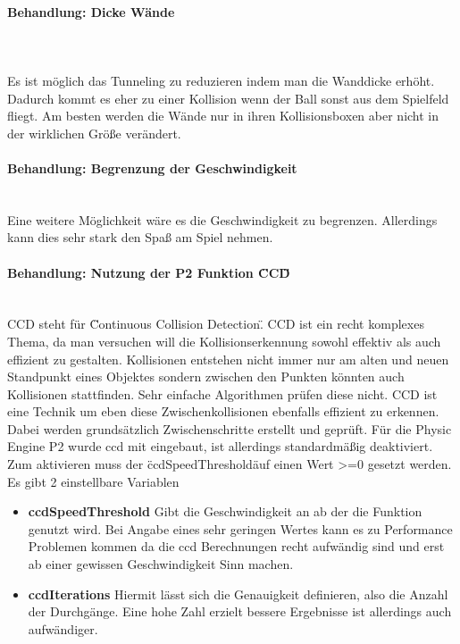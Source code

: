 \paragraph{Behandlung: Dicke Wände}\\
\mbox{}\\
Es ist möglich das Tunneling zu reduzieren indem man die Wanddicke erhöht. Dadurch kommt es eher zu einer Kollision wenn der Ball sonst aus dem Spielfeld fliegt.
\newline
Am besten werden die Wände nur in ihren Kollisionsboxen aber nicht in der wirklichen Größe verändert.
\paragraph{Behandlung: Begrenzung der Geschwindigkeit}
\mbox{}\\
Eine weitere Möglichkeit wäre es die Geschwindigkeit zu begrenzen. Allerdings kann dies sehr stark den Spaß am Spiel nehmen.
\paragraph{Behandlung: Nutzung der P2 Funktion \"CCD\" }
\mbox{}\\
CCD steht für \"Continuous Collision Detection\". 
\newline
CCD ist ein recht komplexes Thema, da man versuchen will die Kollisionserkennung sowohl effektiv als auch effizient zu gestalten.
\newline
Kollisionen entstehen nicht immer nur am alten und neuen Standpunkt eines Objektes sondern zwischen den Punkten könnten auch Kollisionen stattfinden. Sehr einfache Algorithmen prüfen diese nicht.
\newline
CCD ist eine Technik um eben diese Zwischenkollisionen ebenfalls effizient zu erkennen. Dabei werden grundsätzlich Zwischenschritte erstellt und geprüft.
\newline
Für die Physic Engine P2 wurde ccd mit eingebaut, ist allerdings standardmäßig deaktiviert.
Zum aktivieren muss der \"ccdSpeedThreshold\" auf einen Wert >=0 gesetzt werden.
\newline
Es gibt 2 einstellbare Variablen
\begin{itemize}
\item
\textbf{ccdSpeedThreshold} Gibt die Geschwindigkeit an ab der die Funktion genutzt wird. Bei Angabe eines sehr geringen Wertes kann es zu Performance Problemen kommen da die ccd Berechnungen recht aufwändig sind und erst ab einer gewissen Geschwindigkeit Sinn machen.
\item
\textbf{ccdIterations} Hiermit lässt sich die Genauigkeit definieren, also die Anzahl der Durchgänge. Eine hohe Zahl erzielt bessere Ergebnisse ist allerdings auch aufwändiger.
\end{itemize}
